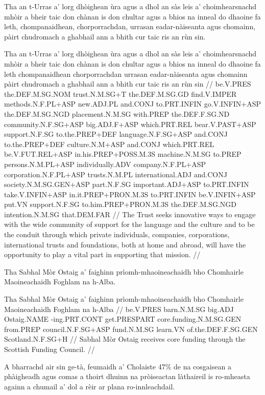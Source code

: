 \documentclass[a4paper,10pt]{article}
\begin{document}
\ex
\begingl
\glpre Tha an t-Urras a' lorg dhòighean ùra agus a dhol an sàs leis a' choimhearsnachd mhòir a bheir taic don chànan is don chultar agus a bhios na inneal do dhaoine fa leth, chompanaidhean, chorporrachdan, urrasan eadar-nàiseanta agus chomainn, pàirt chudromach a ghabhail ann a bhith cur taic ris an rùn sin. 

\vspace{4mm}
\gla Tha an t-Urras a' lorg dhòighean ùra agus a dhol an sàs leis a' choimhearsnachd mhòir a bheir taic don chànan is don chultar agus a bhios na inneal do dhaoine {fa leth} chompanaidhean chorporrachdan urrasan eadar-nàiseanta agus chomainn pàirt chudromach a ghabhail ann a bhith cur taic ris an rùn sin  //
\glb be.V.PRES the.DEF.M.SG.NOM trust.N.M.SG+T the.DEF.M.SG.GD find.V.IMPER methods.N.F.PL+ASP new.ADJ.PL and.CONJ to.PRT.INFIN go.V.INFIN+ASP the.DEF.M.SG.NGD placement.N.M.SG with.PREP the.DEF.F.SG.ND community.N.F.SG+ASP big.ADJ.F+ASP which.PRT.REL bear.V.PAST+ASP support.N.F.SG to.the.PREP+DEF language.N.F.SG+ASP and.CONJ to.the.PREP+DEF culture.N.M+ASP and.CONJ which.PRT.REL be.V.FUT.REL+ASP in.his.PREP+POSS.M.3S machine.N.M.SG to.PREP persons.N.M.PL+ASP individually.ADV company.N.F.PL+ASP corporation.N.F.PL+ASP trusts.N.M.PL international.ADJ and.CONJ society.N.M.SG.GEN+ASP part.N.F.SG important.ADJ+ASP to.PRT.INFIN take.V.INFIN+ASP in.it.PREP+PRON.M.3S to.PRT.INFIN be.V.INFIN+ASP put.VN support.N.F.SG to.him.PREP+PRON.M.3S the.DEF.M.SG.NGD intention.N.M.SG that.DEM.FAR  //
\glft The Trust seeks innovative ways to engage with the wide community of support for the language and the culture and to be the conduit through which private individuals, companies, corporations, international trusts and foundations, both at home and abroad, will have the opportunity to play a vital part in supporting that mission. //
\endgl
\xe

\ex
\begingl
\glpre Tha Sabhal Mòr Ostaig a' faighinn prìomh-mhaoineachaidh bho Chomhairle Maoineachaidh Foghlam na h-Alba. 

\vspace{4mm}
\gla Tha Sabhal Mòr Ostaig a' faighinn prìomh-mhaoineachaidh bho Chomhairle Maoineachaidh Foghlam na h-Alba  //
\glb be.V.PRES barn.N.M.SG big.ADJ Ostaig.NAME -ing.PRT.CONT get.PRESPART core.funding.N.M.SG.GEN from.PREP council.N.F.SG+ASP fund.N.M.SG learn.VN of.the.DEF.F.SG.GEN Scotland.N.F.SG+H  //
\glft Sabhal Mòr Ostaig receives core funding through the Scottish Funding Council. //
\endgl
\xe

\ex
\begingl
\glpre A bharrachd air sin ge-tà, feumaidh a' Cholaiste 47\% de na cosgaisean a phàigheadh agus comas a thoirt dhuinn na pròiseactan làthaireil is ro-mheasta againn a chumail a' dol a rèir ar plana ro-innleachdail. 
\end{document}
